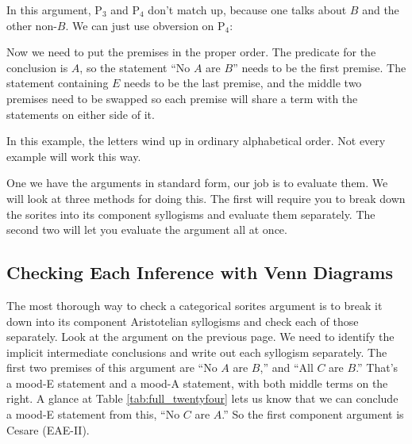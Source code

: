 \begin{kormanize}
\end{kormanize}

In this argument, P$_3$ and P$_4$ don't match up, because one talks about $B$ and the other non-$B$. We can just use obversion on P$_4$:

\begin{kormanize}
\end{kormanize}

Now we need to put the premises in the proper order. The predicate for the conclusion is $A$, so the statement ``No $A$ are $B$'' needs to be the first premise. The statement containing $E$ needs to be the last premise, and the middle two premises need to be swapped so each premise will share a term with the statements on either side of it.

\begin{kormanize}
\end{kormanize}
\label{standard_forms_sorites_1}

In this example, the letters wind up in ordinary alphabetical order. Not every example will work this way.

One we have the arguments in standard form, our job is to evaluate them. We will look at three methods for doing this. The first will require you to break down the sorites into its component syllogisms and evaluate them separately. The second two will let you evaluate the argument all at once.

\subsection{Checking Each Inference with Venn Diagrams}

The most thorough way to check a categorical sorites argument is to break it down into its component Aristotelian syllogisms and check each of those separately. Look at the argument on the previous page. We need to identify the implicit intermediate conclusions and write out each syllogism separately. The first two premises of this argument are ``No $A$ are $B$,'' and ``All $C$ are $B$.'' That's a mood-E statement and a mood-A statement, with both middle terms on the right. A glance at Table \ref{tab:full_twentyfour} lets us know that we can conclude a mood-E statement from this, ``No $C$ are $A$.'' So the first component argument is Cesare (EAE-II).

